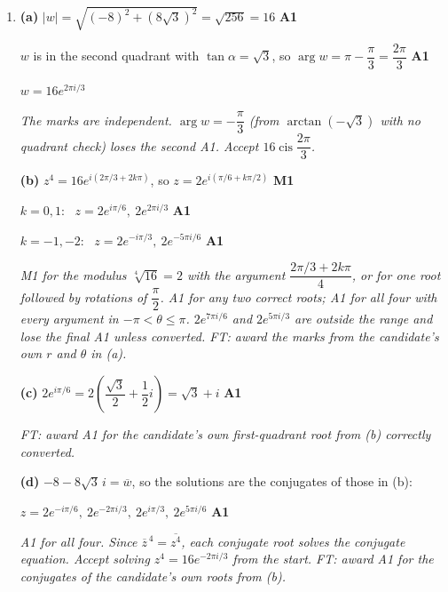 \documentclass[12pt, twoside]{article}
\begin{document}
\begin{enumerate}[itemsep=0.3cm]
\emph{R1 requires the reason to name the non-real coefficient. ``Because
$4 - 2i$ and $-2 + 2i$ are not conjugates'' only restates the question and
earns nothing.}

\newpage

\item[2.] [Maximum mark: 7]

\textbf{(a)} $|w| = \sqrt{(-8)^{2} + (8\sqrt{3})^{2}} = \sqrt{256} = 16$
\hfill \textbf{A1}

$w$ is in the second quadrant with $\tan\alpha = \sqrt{3}$, so
$\arg w = \pi - \dfrac{\pi}{3} = \dfrac{2\pi}{3}$ \hfill \textbf{A1}

$w = 16e^{2\pi i/3}$

\emph{The marks are independent. $\arg w = -\dfrac{\pi}{3}$ (from
$\arctan(-\sqrt{3})$ with no quadrant check) loses the second A1. Accept
$16\operatorname{cis}\dfrac{2\pi}{3}$.}

\textbf{(b)} $z^{4} = 16e^{i(2\pi/3 + 2k\pi)}$, so
$z = 2e^{i(\pi/6 + k\pi/2)}$ \hfill \textbf{M1}

$k = 0, 1$: \ $z = 2e^{i\pi/6}, \ 2e^{2\pi i/3}$ \hfill \textbf{A1}

$k = -1, -2$: \ $z = 2e^{-i\pi/3}, \ 2e^{-5\pi i/6}$ \hfill \textbf{A1}

\emph{M1 for the modulus $\sqrt[4]{16} = 2$ with the argument
$\dfrac{2\pi/3 + 2k\pi}{4}$, or for one root followed by rotations of
$\dfrac{\pi}{2}$. A1 for any two correct roots; A1 for all four with every
argument in $-\pi < \theta \leq \pi$. $2e^{7\pi i/6}$ and $2e^{5\pi i/3}$ are
outside the range and lose the final A1 unless converted. FT: award the
marks from the candidate's own $r$ and $\theta$ in (a).}

\textbf{(c)} $2e^{i\pi/6} = 2\left(\dfrac{\sqrt{3}}{2} + \dfrac{1}{2}i\right)
= \sqrt{3} + i$ \hfill \textbf{A1}

\emph{FT: award A1 for the candidate's own first-quadrant root from (b)
correctly converted.}

\textbf{(d)} $-8 - 8\sqrt{3}\,i = \overline{w}$, so the solutions are the
conjugates of those in (b):

$z = 2e^{-i\pi/6}, \ 2e^{-2\pi i/3}, \ 2e^{i\pi/3}, \ 2e^{5\pi i/6}$
\hfill \textbf{A1}

\emph{A1 for all four. Since $\overline{z}^{\,4} = \overline{z^{4}}$, each
conjugate root solves the conjugate equation. Accept solving
$z^{4} = 16e^{-2\pi i/3}$ from the start. FT: award A1 for the conjugates of the
candidate's own roots from (b).}


\end{enumerate}
\end{document}
